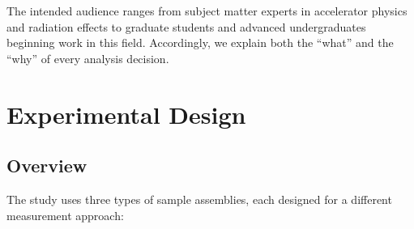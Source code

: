 \documentclass[11pt,letterpaper]{article}
\begin{document}
The intended audience ranges from subject matter experts in accelerator physics
and radiation effects to graduate students and advanced undergraduates beginning
work in this field. Accordingly, we explain both the ``what'' and the ``why'' of
every analysis decision.

\section{Experimental Design}
\label{sec:design}

\subsection{Overview}

The study uses three types of sample assemblies, each designed for a different
measurement approach:
\end{document}
